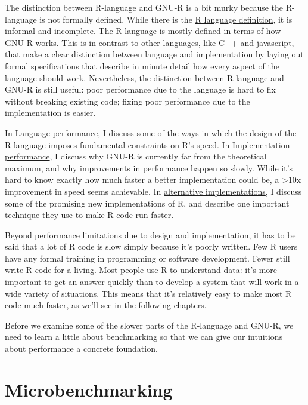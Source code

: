 The distinction between R-language and GNU-R is a bit murky because the
R-language is not formally defined. While there is the
\href{http://cran.r-project.org/doc/manuals/R-lang.html}{R language
definition}, it is informal and incomplete. The R-language is mostly
defined in terms of how GNU-R works. This is in contrast to other
languages, like \href{http://isocpp.org/std/the-standard}{C++} and
\href{http://www.ecma-international.org/publications/standards/Ecma-262.htm}{javascript},
that make a clear distinction between language and implementation by
laying out formal specifications that describe in minute detail how
every aspect of the language should work. Nevertheless, the distinction
between R-language and GNU-R is still useful: poor performance due to
the language is hard to fix without breaking existing code; fixing poor
performance due to the implementation is easier.

In \protect\hyperlink{language-performance}{Language performance}, I
discuss some of the ways in which the design of the R-language imposes
fundamental constraints on R's speed. In
\protect\hyperlink{implementation-performance}{Implementation
performance}, I discuss why GNU-R is currently far from the theoretical
maximum, and why improvements in performance happen so slowly. While
it's hard to know exactly how much faster a better implementation could
be, a \textgreater{}10x improvement in speed seems achievable. In
\protect\hyperlink{faster-r}{alternative implementations}, I discuss
some of the promising new implementations of R, and describe one
important technique they use to make R code run faster.

Beyond performance limitations due to design and implementation, it has
to be said that a lot of R code is slow simply because it's poorly
written. Few R users have any formal training in programming or software
development. Fewer still write R code for a living. Most people use R to
understand data: it's more important to get an answer quickly than to
develop a system that will work in a wide variety of situations. This
means that it's relatively easy to make most R code much faster, as
we'll see in the following chapters.

Before we examine some of the slower parts of the R-language and GNU-R,
we need to learn a little about benchmarking so that we can give our
intuitions about performance a concrete foundation.

\hypertarget{microbenchmarking}{%
\section{Microbenchmarking}\label{microbenchmarking}}

